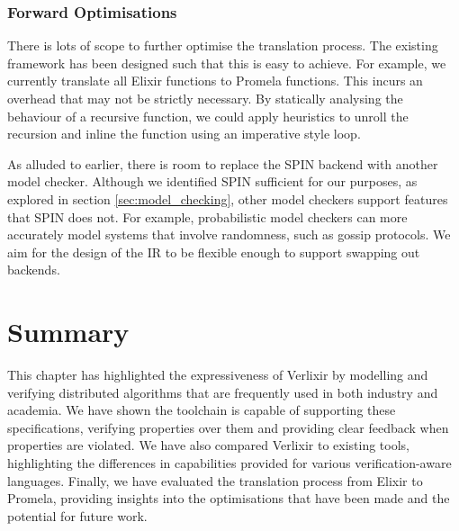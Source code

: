 \subsubsection{Forward Optimisations}
There is lots of scope to further optimise the translation process. The existing framework has been designed such that this is easy to achieve. For example, we currently translate all Elixir functions to Promela functions. This incurs an overhead that may not be strictly necessary. By statically analysing the behaviour of a recursive function, we could apply heuristics to unroll the recursion and inline the function using an imperative style loop.
\par
As alluded to earlier, there is room to replace the SPIN backend with another model checker. Although we identified SPIN sufficient for our purposes, as explored in section \ref{sec:model_checking}, other model checkers support features that SPIN does not. For example, probabilistic model checkers can more accurately model systems that involve randomness, such as gossip protocols. We aim for the design of the IR to be flexible enough to support swapping out backends. 
\section{Summary}
This chapter has highlighted the expressiveness of Verlixir by modelling and verifying distributed algorithms that are frequently used in both industry and academia. We have shown the toolchain is capable of supporting these specifications, verifying properties over them and providing clear feedback when properties are violated. We have also compared Verlixir to existing tools, highlighting the differences in capabilities provided for various verification-aware languages. Finally, we have evaluated the translation process from Elixir to Promela, providing insights into the optimisations that have been made and the potential for future work.